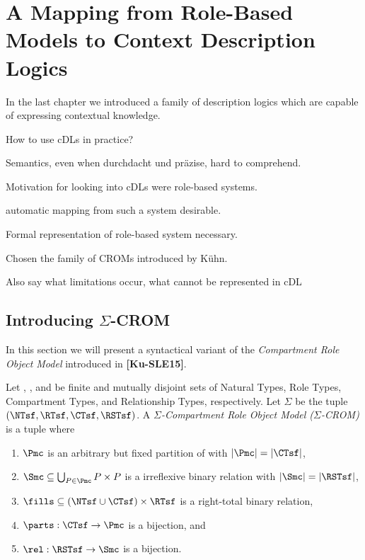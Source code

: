 
\chapter{A Mapping from Role-Based Models to Context Description Logics}
\label{cha:mapping}

In the last chapter we introduced a family of description logics which are capable of expressing
contextual knowledge. 

 

How to use cDLs in practice?

Semantics, even when durchdacht und präzise, hard to comprehend.

Motivation for looking into cDLs were role-based systems.

automatic mapping from such a system desirable.

Formal representation of role-based system necessary.

Chosen the family of CROMs introduced by Kühn.

Also say what limitations occur, what cannot be represented in cDL


\section{Introducing \texorpdfstring{$\Sigma$}{Σ}-CROM}
\label{sec:sigma-crom}


In this section we will present a syntactical variant of the \emph{Compartment Role Object Model}
introduced in \textbf{[Ku-SLE15]}.

\begin{definition}
  Let \NTsf, \RTsf, \CTsf and \RSTsf be finite and mutually disjoint sets of Natural Types, Role
  Types, Compartment Types, and Relationship Types, respectively.  Let $\Sigma$ be the tuple
  $(\NTsf, \RTsf, \CTsf,\RSTsf)$.  A \emph{$\Sigma$-Compartment Role Object Model ($\Sigma$-CROM)}
  \Mmc is a tuple \MM where
  \begin{enumerate}
  \item $\Pmc$ is an arbitrary but fixed partition of \RTsf with $|\Pmc|=|\CTsf|$,
  \item $\Smc\subseteq\bigcup_{P\in\Pmc}P\times P$ is a irreflexive binary relation with
    $|\Smc|=|\RSTsf|$,
  \item $\fills\subseteq(\NTsf\cup\CTsf)\times\RTsf$ is a right-total binary relation,
  \item $\parts:\CTsf\to\Pmc$ is a bijection, and
  \item $\rel:\RSTsf\to\Smc$ is a bijection. \qedhere
  \end{enumerate}
\end{definition}

